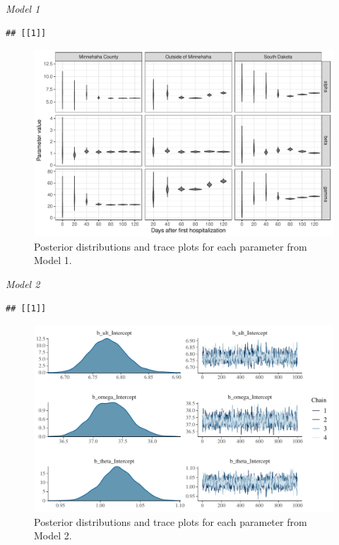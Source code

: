 \documentclass[
]{article}
\begin{document}
\emph{Model 1}

\begin{verbatim}
## [[1]]
\end{verbatim}

\begin{figure}
\centering
\includegraphics{manuscript_files/figure-latex/unnamed-chunk-7-1.pdf}
\caption{\label{fig:unnamed-chunk-7}Posterior distributions and trace plots for each parameter from Model 1.}
\end{figure}

\emph{Model 2}

\begin{verbatim}
## [[1]]
\end{verbatim}

\begin{figure}
\centering
\includegraphics{manuscript_files/figure-latex/unnamed-chunk-8-1.pdf}
\caption{\label{fig:unnamed-chunk-8}Posterior distributions and trace plots for each parameter from Model 2.}
\end{figure}
\end{document}
